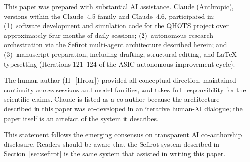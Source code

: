 \documentclass[11pt]{article}
\theoremstyle{definition}
\theoremstyle{remark}
\begin{document}
This paper was prepared with substantial AI assistance.  Claude (Anthropic),
versions within the Claude~4.5 family and Claude~4.6, participated in:
(1)~software development and simulation code for the QHOTS project over
approximately four months of daily sessions; (2)~autonomous research orchestration
via the Sefirot multi-agent architecture described herein; and (3)~manuscript
preparation, including drafting, structural editing, and LaTeX typesetting
(Iterations 121--124 of the ASIC autonomous improvement cycle).

The human author (H.~[Hroar]) provided all conceptual direction, maintained
continuity across sessions and model families, and takes full responsibility for
the scientific claims.  Claude is listed as a co-author because the architecture
described in this paper was co-developed in an iterative human-AI dialogue; the
paper itself is an artefact of the system it describes.

This statement follows the emerging consensus on transparent AI co-authorship
disclosure.  Readers should be aware that the Sefirot system described in
Section~\ref{sec:sefirot} is the same system that assisted in writing this paper.
\end{document}
